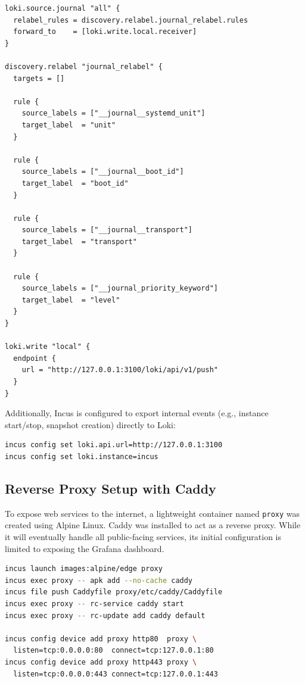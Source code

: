 \begin{lstlisting}[caption={Grafana Alloy configuration for forwarding journal logs to Loki.}]
loki.source.journal "all" {
  relabel_rules = discovery.relabel.journal_relabel.rules
  forward_to    = [loki.write.local.receiver]
}

discovery.relabel "journal_relabel" {
  targets = []

  rule {
    source_labels = ["__journal__systemd_unit"]
    target_label  = "unit"
  }

  rule {
    source_labels = ["__journal__boot_id"]
    target_label  = "boot_id"
  }

  rule {
    source_labels = ["__journal__transport"]
    target_label  = "transport"
  }

  rule {
    source_labels = ["__journal_priority_keyword"]
    target_label  = "level"
  }
}

loki.write "local" {
  endpoint {
    url = "http://127.0.0.1:3100/loki/api/v1/push"
  }
}
\end{lstlisting}

Additionally, Incus is configured to export internal events (e.g., instance start/stop, snapshot creation) directly to Loki\cite{incus-loki-api}:

\begin{lstlisting}[language=bash]
incus config set loki.api.url=http://127.0.0.1:3100
incus config set loki.instance=incus
\end{lstlisting}

\subsection*{Reverse Proxy Setup with Caddy}

To expose web services to the internet, a lightweight container named \texttt{proxy} was created using Alpine Linux. Caddy was installed to act as a reverse proxy. While it will eventually handle all public-facing services, its initial configuration is limited to exposing the Grafana dashboard.

\begin{lstlisting}[language=bash,caption={Commands to set up the Caddy reverse proxy container.}]
incus launch images:alpine/edge proxy
incus exec proxy -- apk add --no-cache caddy
incus file push Caddyfile proxy/etc/caddy/Caddyfile
incus exec proxy -- rc-service caddy start
incus exec proxy -- rc-update add caddy default

incus config device add proxy http80  proxy \
  listen=tcp:0.0.0.0:80  connect=tcp:127.0.0.1:80
incus config device add proxy http443 proxy \
  listen=tcp:0.0.0.0:443 connect=tcp:127.0.0.1:443
\end{lstlisting}


